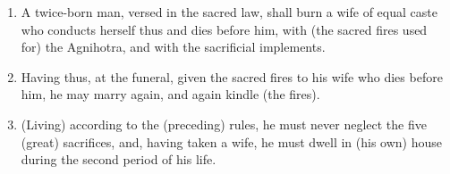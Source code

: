 \begin{enumerate}
\item A twice-born man, versed in the sacred law, shall burn a wife of equal caste who conducts herself thus and dies before him, with (the sacred fires used for) the Agnihotra, and with the sacrificial implements.
\item Having thus, at the funeral, given the sacred fires to his wife who dies before him, he may marry again, and again kindle (the fires).
\item (Living) according to the (preceding) rules, he must never neglect the five (great) sacrifices, and, having taken a wife, he must dwell in (his own) house during the second period of his life.
\end{enumerate}
